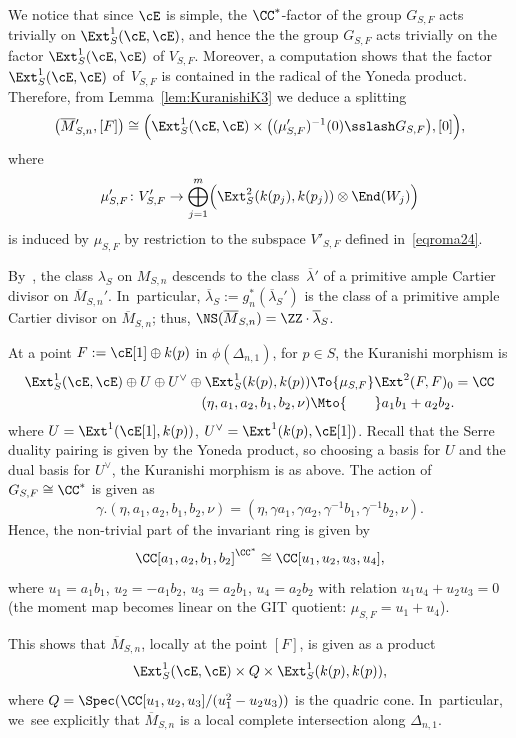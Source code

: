 \begin{rema}\label{rmk:SplitKuranishi}
We notice that since $\cE$ is simple, the $\CC^*$-factor of the group $G_{S,F}$ acts trivially on $\Ext^1_S(\cE,\cE)$, and hence the the group $G_{S,F}$ acts trivially on the factor $\Ext^1_S(\cE,\cE)$ of $V_{S,F}$.
Moreover, a computation shows that the factor $\Ext^1_S(\cE,\cE)$ of~$V_{S,F}$ is contained in the radical of the Yoneda product.
Therefore, from Lemma~\ref{lem:KuranishiK3} we deduce a splitting
\begin{equation*}\label{eq:SplittingK3}
\left(\overline{M}{}_{S,n}',[F]\right)\cong \Bigl(\Ext^1_S(\cE,\cE)\times \bigl((\mu_{S,F}')^{-1}(0)\sslash G_{S,F}\bigr),[0]\Bigr),
\end{equation*}
where
\[
\mu_{S,F}'\colon V_{S,F}'\to \bigoplus_{j=1}^m \Bigl(\Ext^2_S(k(p_j),k(p_j))\otimes \End(W_j) \Bigr)
\]
is induced by $\mu_{S,F}$ by restriction to the subspace $V'_{S,F}$ defined in~\eqref{eqroma24}.
\end{rema}

\begin{rema}\label{rmk:AmpleLineBundleDUYK3}
By~\cite[Th.\,21.25]{BLMNPS:family}, the class $\lambda_S$ on $M_{S,n}$ descends to the class~$\overline{\lambda}{}'$ of a primitive ample Cartier divisor on $\overline{M}{}_{S,n}'$. In~particular, $\overline{\lambda}{}_S:=g_n^*(\overline{\lambda}{}_S')$ is the class of a primitive ample Cartier divisor on $\overline{M}_{S,n}$; thus, $\NS(\overline{M}_{S,n})=\ZZ \cdot \overline{\lambda}{}_S$.
\end{rema}

\begin{rema}\label{rmk:KuranishiDelta1}
At a point $F:=\cE[1] \oplus k(p)$ in $\phi(\Delta_{n,1})$, for $p\in S$, the Kuranishi morphism is
\[
\begin{aligned}
\Ext^1_S(\cE,\cE) \oplus U \oplus U^\vee \oplus \Ext^1_S(k(p),k(p)) & \To{\mu_{S,F}} \Ext^2(F,F)_0=\CC\\
(\eta, a_1,a_2,b_1,b_2, \nu) & \Mto{\hphantom{\mu_{S,F}}} a_1b_1+a_2b_2.
\end{aligned}
\]
where $U=\Ext^1(\cE[1],k(p))$, $U^\vee=\Ext^1(k(p),\cE[1])$. Recall that the Serre duality pairing is given by the Yoneda product, so choosing a basis for $U$ and the dual basis for $U^\vee$, the Kuranishi morphism is as above.
The action of $G_{S,F}\cong\CC^*$ is given as
\[
\gamma.(\eta,a_1,a_2,b_1,b_2,\nu)=(\eta,\gamma a_1,\gamma a_2,\gamma^{-1} b_1, \gamma^{-1} b_2,\nu).
\]
Hence, the non-trivial part of the invariant ring is given by
\[
\CC[a_1,a_2,b_1,b_2]^{\CC^*} \cong \CC[u_1,u_2,u_3,u_4],
\]
where $u_1=a_1b_1$, $u_2=-a_1b_2$, $u_3=a_2b_1$, $u_4=a_2b_2$ with relation $u_1u_4+u_2u_3=0$ (the moment map becomes linear on the GIT quotient: $\mu_{S,F}=u_1+u_4$).

This shows that $\overline{M}_{S,n}$, locally at the point $[F]$, is given as a product
\[
\Ext^1_S(\cE,\cE)\times Q \times \Ext^1_S(k(p),k(p)),
\]
where $Q=\Spec(\CC[u_1,u_2,u_3]/(u_1^2-u_2u_3))$ is the quadric cone. In~particular, we~see explicitly that $\overline{M}_{S,n}$ is a local complete intersection along $\Delta_{n,1}$.
\end{rema}

